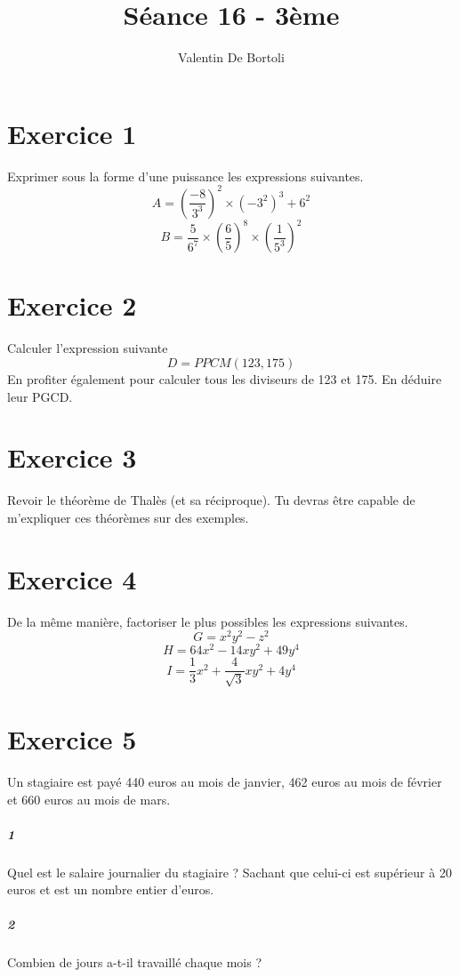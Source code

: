 \documentclass[10pt,a4paper]{article}
\title{Séance 16 - 3ème}
\author{Valentin De Bortoli}
\begin{document}
\maketitle
\section{Exercice 1}
Exprimer sous la forme d'une puissance les expressions suivantes.
\begin{equation}
A=\left( \frac{-8}{3^3}\right)^2 \times (-3^2)^3 +6^2
\end{equation}
\begin{equation}
B=\frac{5}{6^7}\times \left( \frac{6}{5} \right)^8 \times\left( \frac{1}{5^3} \right)^2
\end{equation}
\section{Exercice 2}
Calculer l'expression suivante
\begin{equation}
D=PPCM(123,175)
\end{equation}
En profiter également pour calculer tous les diviseurs de 123 et 175. En déduire leur PGCD.
\section{Exercice 3}
Revoir le théorème de Thalès (et sa réciproque). Tu devras être capable de m'expliquer ces théorèmes sur des exemples.
\section{Exercice 4}
De la même manière, factoriser le plus possibles les expressions suivantes.
\begin{equation}
G=x^2y^2-z^2
\end{equation}
\begin{equation}
H=64x^2-14xy^2+49y^4
\end{equation}
\begin{equation}
I=\frac{1}{3}x^2+\frac{4}{\sqrt{3}}xy^2+4y^4
\end{equation}
\section{Exercice 5}
Un stagiaire est payé 440 euros au mois de janvier, 462 euros au mois de février et 660 euros au mois de mars.
\subparagraph{1}Quel est le salaire journalier du stagiaire ? Sachant que celui-ci est supérieur à 20 euros et est un nombre entier d'euros.
\subparagraph{2}Combien de jours a-t-il travaillé chaque mois ?
\end{document}
